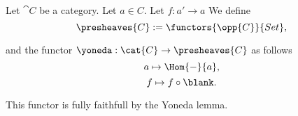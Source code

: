 \begin{definition}
Let $\cat{C}$ be a category.
Let $a\in C$.
Let $f: a' \rightarrow a$
We define
\[\presheaves{C} := \functors{\opp{C}}{Set},\]

and the functor $\yoneda: \cat{C} \rightarrow  \presheaves{C}$ as follows 
\[a \mapsto \Hom{-}{a},\]
\[f \mapsto f \circ \blank.\]

This functor is fully faithfull by the Yoneda lemma.
\end{definition}